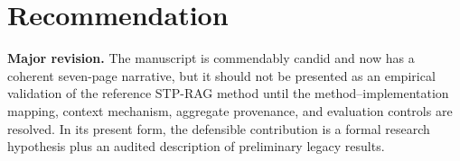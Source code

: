 \documentclass[11pt]{article}
\begin{document}
\section*{Recommendation}

\textbf{Major revision.} The manuscript is commendably candid and now has a coherent seven-page narrative, but it should not be presented as an empirical validation of the reference STP-RAG method until the method--implementation mapping, context mechanism, aggregate provenance, and evaluation controls are resolved. In its present form, the defensible contribution is a formal research hypothesis plus an audited description of preliminary legacy results.
\end{document}
